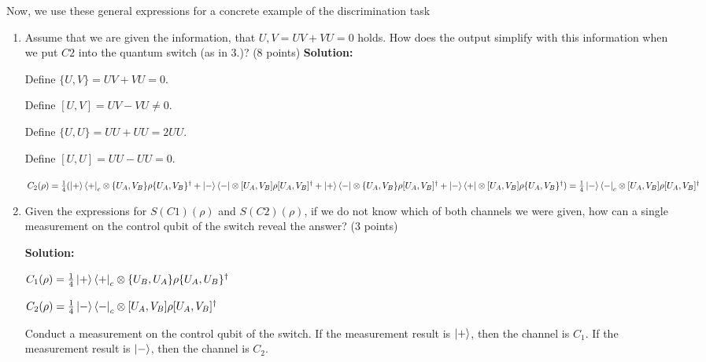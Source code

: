 \documentclass[12pt]{article}
\begin{document}
Now, we use these general expressions for a concrete example of the discrimination task


\begin{enumerate}[start=4]
    \item Assume that we are given the information, that $U, V = UV + VU = 0$ holds. How does the output simplify with this information when we put $C2$ into the quantum switch (as in 3.)? (8 points)
    \textbf{Solution:}

    Define $\{U,V\}=UV+VU=0$.

    Define $[U,V]=UV-VU\neq0$.

    Define $\{U,U\}=UU+UU=2UU$.

    Define $[U,U]=UU-UU=0$.

    $C_2(\rho) = \frac{1}{4}(
        \ket{+}\bra{+}_c\otimes \{U_A,V_B\}\rho \{U_A,V_B\}^{\dagger}
        +\ket{-}\bra{-}\otimes [U_A,V_B]\rho [U_A,V_B]^{\dagger}
        +\ket{+}\bra{-}\otimes \{U_A,V_B\}\rho [U_A,V_B]^{\dagger}
        +\ket{-}\bra{+}\otimes [U_A,V_B]\rho \{U_A,V_B\}^{\dagger}
    )
    \\=\frac{1}{4}\ket{-}\bra{-}_c\otimes [U_A,V_B]\rho [U_A,V_B]^{\dagger}
    $

    \item Given the expressions for $S(C1)(\rho)$ and $S(C2)(\rho)$, if we do not know which of both channels we were given, how can a single measurement on the control qubit of the switch reveal the answer? (3 points)
    
    \textbf{Solution:}

    $C_1(\rho)=\frac{1}{4}\ket{+}\bra{+}_c\otimes \{U_B,U_A\}\rho \{U_A,U_B\}^{\dagger}$
    
    
    $C_2(\rho)=\frac{1}{4}\ket{-}\bra{-}_c\otimes [U_A,V_B]\rho [U_A,V_B]^{\dagger}$


    Conduct a measurement on the control qubit of the switch. If the measurement result is $\ket{+}$, then the channel is $C_1$. If the measurement result is $\ket{-}$, then the channel is $C_2$.

\end{enumerate}
\end{document}

